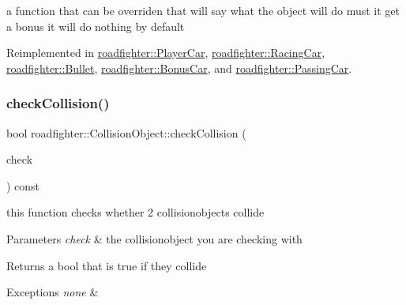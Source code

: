 a function that can be overriden that will say what the object will do must it get a bonus it will do nothing by default 

Reimplemented in \hyperlink{classroadfighter_1_1PlayerCar_a0f0626a6ea7d25e3ba01a8289d54acac}{roadfighter\+::\+Player\+Car}, \hyperlink{classroadfighter_1_1RacingCar_a5858dd3f2c7bb49782b29c0a90846a6c}{roadfighter\+::\+Racing\+Car}, \hyperlink{classroadfighter_1_1Bullet_a642ca8467a0ffea844d18d4917b2f49e}{roadfighter\+::\+Bullet}, \hyperlink{classroadfighter_1_1BonusCar_a3d2d15df036c419cd9ad4fbc6fcd4ad9}{roadfighter\+::\+Bonus\+Car}, and \hyperlink{classroadfighter_1_1PassingCar_a43d55e28efe840d81c1b87216920eb69}{roadfighter\+::\+Passing\+Car}.

\mbox{\label{classroadfighter_1_1CollisionObject_a426a06907212c866a22cba7ec84ebe65}} 
\subsubsection{\texorpdfstring{check\+Collision()}{checkCollision()}}
{\footnotesize\ttfamily bool roadfighter\+::\+Collision\+Object\+::check\+Collision (\begin{DoxyParamCaption}\item[{std\+::shared\+\_\+ptr$<$ \hyperlink{classroadfighter_1_1CollisionObject}{Collision\+Object} $>$ \&}]{check }\end{DoxyParamCaption}) const}

this function checks whether 2 collisionobjects collide 
\begin{DoxyParams}{Parameters}
{\em check} & the collisionobject you are checking with \\
\hline
\end{DoxyParams}
\begin{DoxyReturn}{Returns}
a bool that is true if they collide 
\end{DoxyReturn}

\begin{DoxyExceptions}{Exceptions}
{\em none} & \\
\hline
\end{DoxyExceptions}
\mbox{\label{classroadfighter_1_1CollisionObject_a9eba85551432f548f2a0c20217a60f42}} 
